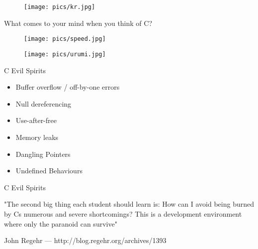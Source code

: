 \documentclass{beamer}
\begin{document}
\begin{frame}{}

\begin{figure}
\texttt{[image: pics/kr.jpg]}
\end{figure}

\end{frame}
\begin{frame}{}

\begin{block}{}
What comes to your mind when you think of C?
\end{block}

\end{frame}
\begin{frame}{}

\begin{figure}
\texttt{[image: pics/speed.jpg]}
\end{figure}

\end{frame}
\begin{frame}{}

\begin{figure}
\texttt{[image: pics/urumi.jpg]}
\end{figure}

\end{frame}
\begin{frame}{C Evil Spirits}

\begin{itemize}
\item Buffer overflow / off-by-one errors
\item Null dereferencing
\item Use-after-free
\item Memory leaks
\item Dangling Pointers
\item Undefined Behaviours 
\end{itemize}

\end{frame}
\begin{frame}{C Evil Spirits}

"The second big thing each student should learn is: How can I avoid being 
burned by Cs numerous and severe shortcomings? This is a development 
environment where only the paranoid can survive"

John Regehr --- http://blog.regehr.org/archives/1393

\end{frame}
\end{document}
